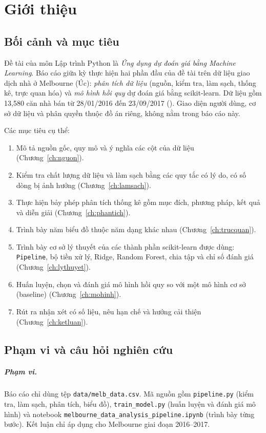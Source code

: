 \chapter{Giới thiệu}

\section{Bối cảnh và mục tiêu}
Đề tài của môn Lập trình Python là \emph{Ứng dụng dự đoán giá bằng Machine Learning}. Báo cáo giữa kỳ thực hiện hai phần đầu của đề tài trên dữ liệu giao dịch nhà ở Melbourne (Úc): \emph{phân tích dữ liệu} (nguồn, kiểm tra, làm sạch, thống kê, trực quan hóa) và \emph{mô hình hồi quy} dự đoán giá bằng scikit-learn. Dữ liệu gồm 13,580 căn nhà bán từ 28/01/2016 đến 23/09/2017 (). Giao diện người dùng, cơ sở dữ liệu và phân quyền thuộc đồ án riêng, không nằm trong báo cáo này.

Các mục tiêu cụ thể:
\begin{enumerate}[nosep]
  \item Mô tả nguồn gốc, quy mô và ý nghĩa các cột của dữ liệu (Chương~\ref{ch:nguon}).
  \item Kiểm tra chất lượng dữ liệu và làm sạch bằng các quy tắc có lý do, có số dòng bị ảnh hưởng (Chương~\ref{ch:lamsach}).
  \item Thực hiện bảy phép phân tích thống kê gồm mục đích, phương pháp, kết quả và diễn giải (Chương~\ref{ch:phantich}).
  \item Trình bày năm biểu đồ thuộc năm dạng khác nhau (Chương~\ref{ch:trucquan}).
  \item Trình bày cơ sở lý thuyết của các thành phần scikit-learn được dùng: \texttt{Pipeline}, bộ tiền xử lý, Ridge, Random Forest, chia tập và chỉ số đánh giá (Chương~\ref{ch:lythuyet}).
  \item Huấn luyện, chọn và đánh giá mô hình hồi quy so với một mô hình cơ sở (baseline) (Chương~\ref{ch:mohinh}).
  \item Rút ra nhận xét có số liệu, nêu hạn chế và hướng cải thiện (Chương~\ref{ch:ketluan}).
\end{enumerate}

\section{Phạm vi và câu hỏi nghiên cứu}
\paragraph{Phạm vi.} Báo cáo chỉ dùng tệp \texttt{data/melb\_data.csv}. Mã nguồn gồm \texttt{pipeline.py} (kiểm tra, làm sạch, phân tích, biểu đồ), \texttt{train\_model.py} (huấn luyện và đánh giá mô hình) và notebook \texttt{melbourne\_\allowbreak data\_\allowbreak analysis\_\allowbreak pipeline.ipynb} (trình bày từng bước). Kết luận chỉ áp dụng cho Melbourne giai đoạn 2016--2017.

